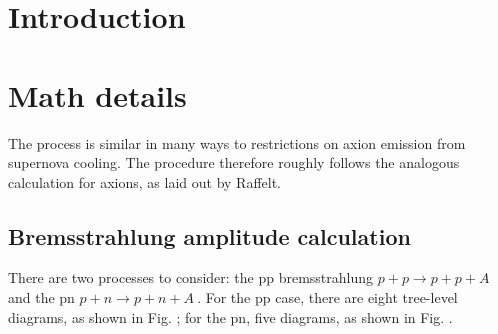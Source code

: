 \documentclass[10pt,a4paper]{article}
\begin{document}
		
	\section{Introduction}
	\section{Math details}
	The process is similar in many ways to restrictions on axion emission from supernova cooling. The procedure therefore roughly follows the analogous calculation for axions, as laid out by Raffelt. 
	\subsection{Bremsstrahlung amplitude calculation}
	 There are two processes to consider: the pp bremsstrahlung $ p+p \rightarrow p+p+A$ and the pn $ p+n \rightarrow p+n+A\ $. For the pp case, there are eight tree-level diagrams, as shown in Fig. ; for the pn, five diagrams, as shown in Fig. . \newline
	
\end{document}
